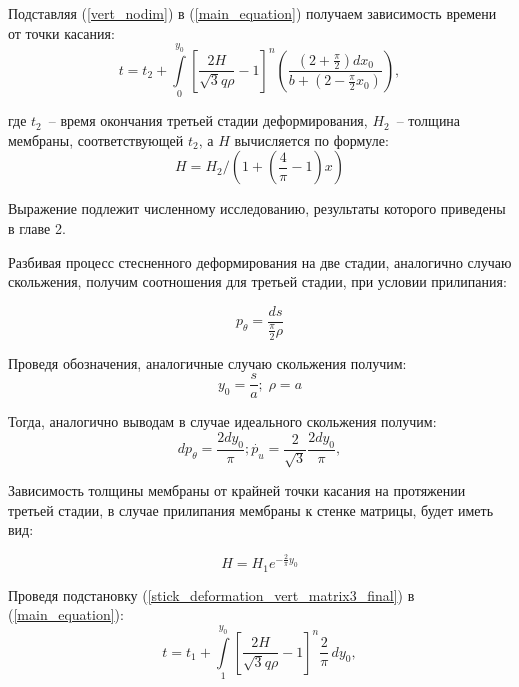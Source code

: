 	Подставляя (\ref{vert_nodim}) в (\ref{main_equation}) получаем зависимость времени от точки касания:
	\begin{equation}
	t = t_2+ \int\limits_0^{y_0}\left[ \dfrac{2H}{\sqrt3 q \rho} -1\right]^n\left(\dfrac{\left( 2+\frac{\pi}{2}\right)dx_0}{b+\left(2-\frac{\pi}{2}x_0\right)}\right),
	\end{equation}
	
где $t_2$~-- время окончания третьей стадии деформирования, $H_2$~-- толщина мембраны, соответствующей $t_2$, а $H$ вычисляется по формуле:
\begin{equation}
 H = H_2/(1+(\dfrac{4}{\pi} - 1)x)
\end{equation}   

Выражение подлежит численному исследованию, результаты которого приведены в главе 2.

Разбивая процесс стесненного деформирования на две стадии, аналогично случаю скольжения, получим соотношения для третьей стадии, при условии прилипания:

\begin{equation}
p_\theta = \dfrac{ds}{\frac{\pi}{2}\rho}
\label{stick_deformation_vert_matrix3}
\end{equation}

Проведя обозначения, аналогичные случаю скольжения получим: 
\begin{equation}
y_0 = \dfrac{s}{a}; \; \rho = a
\end{equation}

Тогда, аналогично выводам в случае идеального скольжения получим:
\begin{equation}
	dp_\theta = \dfrac{2dy_0}{\pi};
	\dot{p_u} = \dfrac{2}{\sqrt 3}\dfrac{2dy_0}{\pi},
\label{stick_deformation_vert_matrix3_final}
\end{equation}

Зависимость толщины мембраны от крайней точки касания на протяжении третьей стадии,
 в случае прилипания мембраны к стенке матрицы, будет иметь вид:
    
 \begin{equation}
   H = H_1 e^{-\frac{2}{\pi}y_0}
   \end{equation}
   
   Проведя подстановку (\ref{stick_deformation_vert_matrix3_final}) в (\ref{main_equation}):
 \begin{equation}
   t = t_1 + \int\limits^{y_0}_1 \left[ \dfrac{2H}{\sqrt3 q \rho} -1\right]^n\dfrac{2}{\pi}\,dy_0,
   \end{equation}

